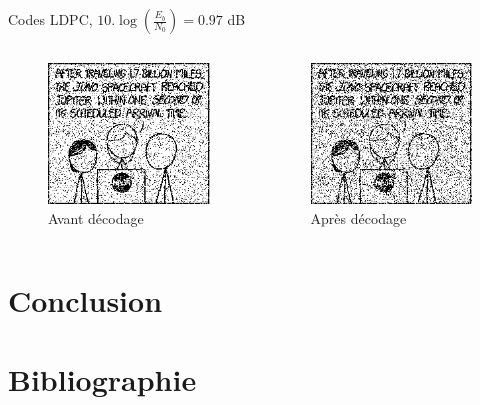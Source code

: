 \documentclass[11pt]{beamer}
\begin{document}
\begin{frame}{Codes LDPC, $10.\log(\frac{E_b}{N_0}) = 0.97$ dB}
	\begin{columns}
		\begin{column}{.5\textwidth}
			\begin{figure}
				\includegraphics[scale=0.6]{ldpc_basic_noisy_80}\\
				Avant d\'ecodage
			\end{figure}
		\end{column}
		\begin{column}{.5\textwidth}
			\begin{figure}
				\includegraphics[scale=0.6]{ldpc_basic_decoded_80}\\
				Apr\`es d\'ecodage
			\end{figure}
		\end{column}
	\end{columns}
\end{frame}


\section*{Conclusion}



\appendix



\section{Bibliographie}
\end{document}
